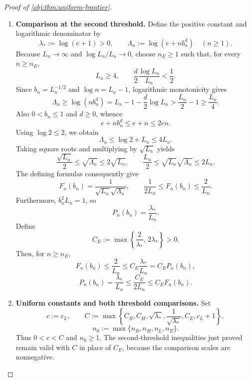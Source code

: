\begin{proof}[Proof of \cref{obj:thm:uniform-frontier}]
\begin{enumerate}
Define
\[
c_L:=c_{\mathrm w}\tau>0,
\qquad
n_L:=\max\{n_{\mathrm w},1\}.
\]
For \(n\ge n_L\), the inequalities \(\tau\le1/5\) and \(\tau\le1-2\alpha-\tau\), together with \(\delta_{n,\sigma}\ge0\), give
\[
c_L\rho_{n,\sigma}=\tau\delta_{n,\sigma}
\le\frac{\delta_{n,\sigma}}5\le R_n(\sigma),
\]
\[
c_L\rho_{n,\sigma}=\tau\delta_{n,\sigma}
\le(1-2\alpha-\tau)\delta_{n,\sigma}\le H_n(\sigma).
\]
We have obtained, uniformly over the path spaces and allowed error scales,
\[
c_L\rho_{n,\sigma}\le R_n(\sigma),
\qquad
c_L\rho_{n,\sigma}\le H_n(\sigma)
\qquad(n\ge n_L).
\]

\item \textbf{Comparison at the second threshold.}
Define the positive constant and logarithmic denominator by
\[
\lambda_*:=\log(e+1)>0,
\qquad
\Lambda_n:=\log(e+n b_n^d)\quad(n\ge1).
\]
Because \(L_n\to\infty\) and \(\log L_n/L_n\to0\), choose \(n_E\ge1\) such that, for every \(n\ge n_E\),
\[
L_n\ge4,
\qquad
\frac d2\frac{\log L_n}{L_n}<\frac12.
\]
Since \(b_n=L_n^{-1/2}\) and \(\log n=L_n-1\), logarithmic monotonicity gives
\[
\Lambda_n
\ge\log(n b_n^d)
=L_n-1-\frac d2\log L_n
>\frac{L_n}{2}-1
\ge\frac{L_n}{4}.
\]
Also \(0<b_n\le1\) and \(d\ge0\), whence
\[
e+n b_n^d\le e+n\le2en.
\]
Using \(\log2\le2\), we obtain
\[
\Lambda_n\le\log2+L_n\le4L_n.
\]
Taking square roots and multiplying by \(\sqrt{L_n}\) yields
\[
\frac{\sqrt{L_n}}2\le\sqrt{\Lambda_n}\le2\sqrt{L_n},
\qquad
\frac{L_n}{2}
\le\sqrt{L_n}\sqrt{\Lambda_n}
\le2L_n.
\]
The defining formulas consequently give
\[
F_n(b_n)=\frac1{\sqrt{L_n}\sqrt{\Lambda_n}},
\qquad
\frac1{2L_n}\le F_n(b_n)\le\frac2{L_n}.
\]
Furthermore, \(b_n^2L_n=1\), so
\[
P_n(b_n)=\frac{\lambda_*}{L_n}.
\]
Define
\[
C_E:=\max\left\{\frac2{\lambda_*},\,2\lambda_*\right\}>0.
\]
Then, for \(n\ge n_E\),
\[
F_n(b_n)
\le\frac2{L_n}
\le C_E\frac{\lambda_*}{L_n}
=C_EP_n(b_n),
\]
\[
P_n(b_n)
=\frac{\lambda_*}{L_n}
\le\frac{C_E}{2L_n}
\le C_EF_n(b_n).
\]

\item \textbf{Uniform constants and both threshold comparisons.}
Set
\[
c:=c_L,
\qquad
C:=\max\left\{
C_R,C_H,\sqrt{\lambda_*},\frac1{\sqrt{\lambda_*}},
C_E,c_L+1
\right\},
\]
\[
n_0:=\max\{n_R,n_H,n_L,n_E\}.
\]
Thus \(0<c<C\) and \(n_0\ge1\). The second-threshold inequalities just proved remain valid with \(C\) in place of \(C_E\), because the comparison scales are nonnegative.


\end{enumerate}
\end{proof}
